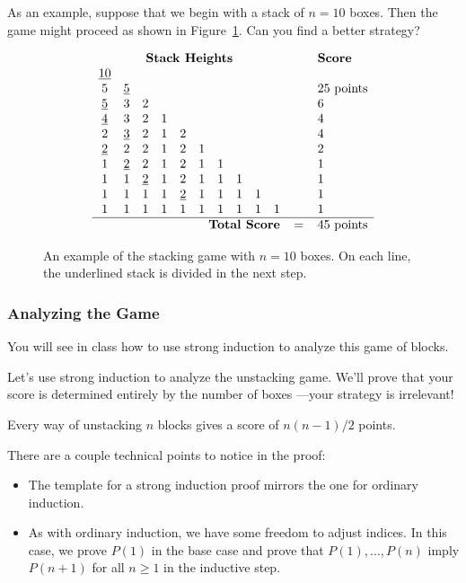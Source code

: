 As an example, suppose that we begin with a stack of $n = 10$ boxes.
Then the game might proceed as shown in Figure~\ref{fig:stacking-10}.
Can you find a better strategy?
%
\begin{figure}\redrawntrue
\[
\begin{array}{cccccccccccl}
\multicolumn{10}{c}{\textbf{Stack Heights}} & \quad & \textbf{Score} \\
\underline{10}&&&&&&&&& && \\
5&\underline{5}&&&&&&&& && 25 \text{ points} \\
\underline{5}&3&2&&&&&&& && 6 \\
\underline{4}&3&2&1&&&&&& && 4 \\
2&\underline{3}&2&1&2&&&&& && 4 \\
\underline{2}&2&2&1&2&1&&&& && 2 \\
1&\underline{2}&2&1&2&1&1&&& && 1 \\
1&1&\underline{2}&1&2&1&1&1&& && 1 \\
1&1&1&1&\underline{2}&1&1&1&1& && 1 \\
1&1&1&1&1&1&1&1&1&1 && 1 \\ \hline
\multicolumn{10}{r}{\textbf{Total Score}} & = & 45 \text{ points}
\end{array}
\]
\caption{An example of the stacking game with $n = 10$ boxes.  On each
line, the underlined stack is divided in the next step.}
\label{fig:stacking-10}
\end{figure}

\subsubsection{Analyzing the Game}

You will see in class how to use strong induction to analyze this game of
blocks.

\iffalse  %

Let's use strong induction to analyze the unstacking game.  We'll prove
that your score is determined entirely by the number of boxes ---your
strategy is irrelevant!

\begin{theorem}\label{stacking}
Every way of unstacking $n$ blocks gives a score of $n(n-1)/2$ points.
\end{theorem}

There are a couple technical points to notice in the proof:

\begin{itemize}

\item The template for a strong induction proof mirrors the one for
  ordinary induction.

\item As with ordinary induction, we have some freedom to adjust indices.
In this case, we prove $P(1)$ in the base case and prove that $P(1),
\dots, P(n)$ imply $P(n+1)$ for all $n \geq 1$ in the inductive step.

\end{itemize}

